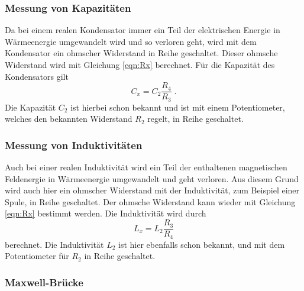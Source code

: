     \subsubsection{Messung von Kapazitäten} \label{sec:Kapazität}


        Da bei einem realen Kondensator immer ein Teil der elektrischen Energie in Wärmeenergie umgewandelt
        wird und so verloren geht, wird mit dem Kondensator ein ohmscher Widerstand in Reihe geschaltet.
        Dieser ohmsche Widerstand wird mit Gleichung \eqref{eqn:Rx} berechnet.
        Für die Kapazität des Kondensators gilt
        \begin{equation}
            C_x = C_2 \frac{R_4}{R_3} \; . \label{eqn:Cx}
        \end{equation}
        Die Kapazität $C_2$ ist hierbei schon bekannt und ist mit einem Potentiometer, welches den bekannten Widerstand $R_2$ regelt,
        in Reihe geschaltet.

    \subsubsection{Messung von Induktivitäten} \label{sec:Induktivität}


        Auch bei einer realen Induktivität wird ein Teil der enthaltenen magnetischen Feldenergie in Wärmeenergie umgewandelt
        und geht verloren. Aus diesem Grund wird auch hier ein ohmscher Widerstand mit der Induktivität, zum Beispiel einer Spule,
        in Reihe geschaltet.
        Der ohmsche Widerstand kann wieder mit Gleichung \eqref{eqn:Rx} bestimmt werden.
        Die Induktivität wird durch
        \begin{equation}
            L_x = L_2 \frac{R_3}{R_4} \label{eqn:Lx}
        \end{equation}
        berechnet.
        Die Induktivität $L_2$ ist hier ebenfalls schon bekannt, und mit dem Potentiometer für $R_2$ in Reihe geschaltet.

    \subsubsection{Maxwell-Brücke} \label{sec:Maxwell}

        

